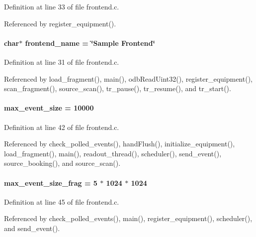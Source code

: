Definition at line 33 of file frontend.c.

Referenced by register\_\-equipment().
\paragraph[{frontend\_\-name}]{\setlength{\rightskip}{0pt plus 5cm}char$\ast$ {\bf frontend\_\-name} = \char`\"{}Sample Frontend\char`\"{}}\hfill\label{frontend_8c_ac1f0c6df66e35778b61c611107501ec4}


Definition at line 31 of file frontend.c.

Referenced by load\_\-fragment(), main(), odbReadUint32(), register\_\-equipment(), scan\_\-fragment(), source\_\-scan(), tr\_\-pause(), tr\_\-resume(), and tr\_\-start().
\paragraph[{max\_\-event\_\-size}]{ {\bf max\_\-event\_\-size} = 10000}\hfill\label{frontend_8c_a13adb6e6b95ca2a62bbfe2453d71a1cd}


Definition at line 42 of file frontend.c.

Referenced by check\_\-polled\_\-events(), handFlush(), initialize\_\-equipment(), load\_\-fragment(), main(), readout\_\-thread(), scheduler(), send\_\-event(), source\_\-booking(), and source\_\-scan().
\paragraph[{max\_\-event\_\-size\_\-frag}]{ {\bf max\_\-event\_\-size\_\-frag} = 5 $\ast$ 1024 $\ast$ 1024}\hfill\label{frontend_8c_a5593758d19398ebc7c3d58d7f05ec160}


Definition at line 45 of file frontend.c.

Referenced by check\_\-polled\_\-events(), main(), register\_\-equipment(), scheduler(), and send\_\-event().
